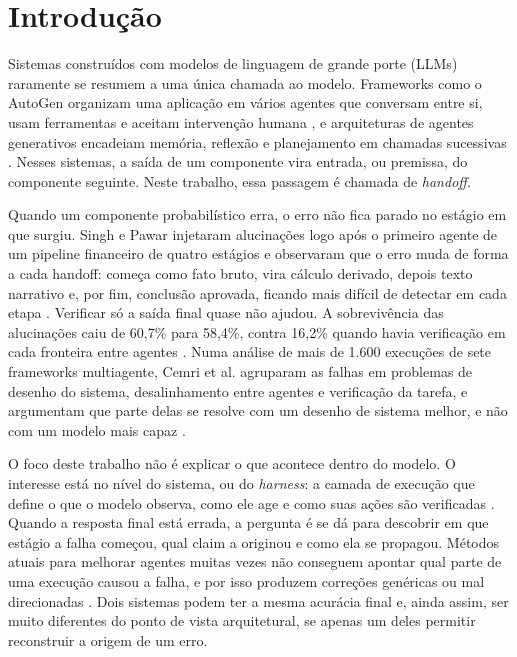 \section{Introdução}\label{sec:introducao}

Sistemas construídos com modelos de linguagem de grande porte (LLMs) raramente se resumem a uma única chamada ao modelo.
Frameworks como o AutoGen organizam uma aplicação em vários agentes que conversam entre si, usam ferramentas e aceitam intervenção humana \cite{wu2023autogen}, e arquiteturas de agentes generativos encadeiam memória, reflexão e planejamento em chamadas sucessivas \cite{park2023generative}.
Nesses sistemas, a saída de um componente vira entrada, ou premissa, do componente seguinte.
Neste trabalho, essa passagem é chamada de \emph{handoff}.

Quando um componente probabilístico erra, o erro não fica parado no estágio em que surgiu.
Singh e Pawar injetaram alucinações logo após o primeiro agente de um pipeline financeiro de quatro estágios e observaram que o erro muda de forma a cada handoff: começa como fato bruto, vira cálculo derivado, depois texto narrativo e, por fim, conclusão aprovada, ficando mais difícil de detectar em cada etapa \cite{singh2026snowball}.
Verificar só a saída final quase não ajudou. A sobrevivência das alucinações caiu de 60,7\% para 58,4\%, contra 16,2\% quando havia verificação em cada fronteira entre agentes \cite{singh2026snowball}.
Numa análise de mais de 1.600 execuções de sete frameworks multiagente, Cemri et al. agruparam as falhas em problemas de desenho do sistema, desalinhamento entre agentes e verificação da tarefa, e argumentam que parte delas se resolve com um desenho de sistema melhor, e não com um modelo mais capaz \cite{cemri2025why}.

O foco deste trabalho não é explicar o que acontece dentro do modelo.
O interesse está no nível do sistema, ou do \emph{harness}: a camada de execução que define o que o modelo observa, como ele age e como suas ações são verificadas \cite{zhong2026harness}.
Quando a resposta final está errada, a pergunta é se dá para descobrir em que estágio a falha começou, qual claim a originou e como ela se propagou.
Métodos atuais para melhorar agentes muitas vezes não conseguem apontar qual parte de uma execução causou a falha, e por isso produzem correções genéricas ou mal direcionadas \cite{chen2026failed}.
Dois sistemas podem ter a mesma acurácia final e, ainda assim, ser muito diferentes do ponto de vista arquitetural, se apenas um deles permitir reconstruir a origem de um erro.

